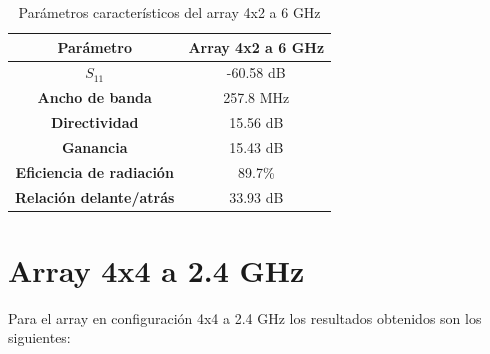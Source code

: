 \begin{table}[H]
  
   
   \small %
   \centering %
   \begin{tabular}{c c} %
   \toprule[\heavyrulewidth]\toprule[\heavyrulewidth]
   \textbf{Parámetro} & \textbf{Array 4x2 a 6 GHz} \\ 
   \midrule
   \textbf{$S_{11}$} & -60.58 dB \\
   \textbf{Ancho de banda} & 257.8 MHz \\
   \textbf{Directividad} & 15.56 dB \\
   \textbf{Ganancia} & 15.43 dB \\
   \textbf{Eficiencia de radiación} & 89.7\% \\
   \textbf{Relación delante/atrás} & 33.93 dB \\

   \bottomrule[\heavyrulewidth] 
   \end{tabular}
   
   \caption{Parámetros característicos del array 4x2 a 6 GHz} 
   \label{tab:res4x22}
\end{table}






















\newpage
\section{Array 4x4 a 2.4 GHz}
\par Para el array en configuración 4x4 a 2.4 GHz los resultados obtenidos son los siguientes:

